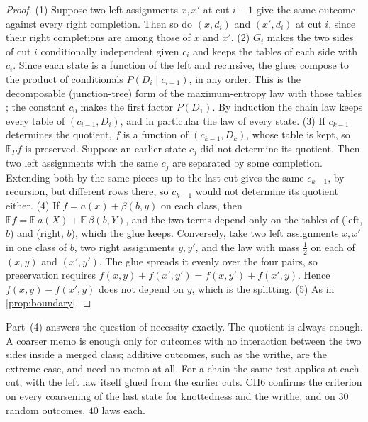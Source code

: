 \documentclass[11pt]{article}
\theoremstyle{definition}\newtheorem{definition}[theorem]{Definition}\newtheorem{remark}[theorem]{Remark}\newtheorem{example}[theorem]{Example}\newtheorem{problem}[theorem]{Open problem}\crefname{problem}{Problem}{Problems}
\begin{document}
\begin{proof}
(1) Suppose two left assignments $x,x'$ at cut $i-1$ give the same outcome against every right completion. Then so do $(x,d_i)$ and $(x',d_i)$ at cut $i$, since their right completions are among those of $x$ and $x'$.
(2) $G_i$ makes the two sides of cut $i$ conditionally independent given $c_i$ and keeps the tables of each side with $c_i$. Since each state is a function of the left and recursive, the glues compose to the product of conditionals $P(D_i\mid c_{i-1})$, in any order. This is the decomposable (junction-tree) form of the maximum-entropy law with those tables \cite{Lauritzen1996}; the constant $c_0$ makes the first factor $P(D_1)$. By induction the chain law keeps every table of $(c_{i-1},D_i)$, and in particular the law of every state.
(3) If $c_{k-1}$ determines the quotient, $f$ is a function of $(c_{k-1},D_k)$, whose table is kept, so $\mathbb E_Pf$ is preserved. Suppose an earlier state $c_j$ did not determine its quotient. Then two left assignments with the same $c_j$ are separated by some completion. Extending both by the same pieces up to the last cut gives the same $c_{k-1}$, by recursion, but different rows there, so $c_{k-1}$ would not determine its quotient either.
(4) If $f=a(x)+\beta(b,y)$ on each class, then $\mathbb E f=\mathbb E\,a(X)+\mathbb E\,\beta(b,Y)$, and the two terms depend only on the tables of (left, $b$) and (right, $b$), which the glue keeps. Conversely, take two left assignments $x,x'$ in one class of $b$, two right assignments $y,y'$, and the law with mass $\tfrac12$ on each of $(x,y)$ and $(x',y')$. The glue spreads it evenly over the four pairs, so preservation requires $f(x,y)+f(x',y')=f(x,y')+f(x',y)$. Hence $f(x,y)-f(x',y)$ does not depend on $y$, which is the splitting.
(5) As in \cref{prop:boundary}.
\end{proof}

Part~(4) answers the question of necessity exactly. The quotient is always enough. A coarser memo is enough only for outcomes with no interaction between the two sides inside a merged class; additive outcomes, such as the writhe, are the extreme case, and need no memo at all. For a chain the same test applies at each cut, with the left law itself glued from the earlier cuts. CH6 confirms the criterion on every coarsening of the last state for knottedness and the writhe, and on $30$ random outcomes, $40$ laws each.
\end{document}
